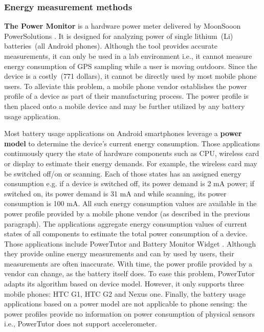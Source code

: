 \subsubsection{Energy measurement methods}
\hspace{10pt} \textbf{The Power Monitor} is a hardware power meter delivered by MoonSooon PowerSolutions \cite{monsoon:powermonitor}.  It is designed for analyzing power of single lithium\ (Li) batteries\ (all Android phones). Although the tool provides accurate measurements, it can only be used in a lab environment i.e., it cannot measure energy consumption of GPS sampling while a user is moving outdoors. Since the device is a costly\ (771 dollars), it cannot be directly used by most mobile phone users. To alleviate this problem, a mobile phone vendor establishes the power profile of a device as part of their manufacturing process. The power profile is then placed onto a mobile device \cite{android:powerprofiles} and may be further utilized by any battery usage application.

Most battery usage applications on Android smartphones leverage a \textbf{power model} to determine the device's current energy consumption. Those applications continuously query the state of hardware components such as CPU, wireless card or display to estimate their energy demands. For example, the wireless card may be switched off/on or scanning. Each of those states has an assigned energy consumption e.g. if a device is switched off, its power demand is 2 mA power; if switched on, its power demand is 31 mA and while scanning, its power consumption is 100 mA. All such energy consumption values are available in the power profile provided by a mobile phone vendor (as described in the previous paragraph). The applications aggregate energy consumption values of current states of all components to estimate the total power consumption of a device. Those applications include PowerTutor \cite{zhang:powertutor} and Battery Monitor Widget \cite{googleplay:batterymonitorwidget}. Although they provide online energy measurements and can by used by users, their measurements are often inaccurate. With time, the power profile provided by a vendor can change, as the battery itself does. To ease this problem, PowerTutor adapts its algorithm based on device model. However, it only supports three mobile phones: HTC G1, HTC G2 and Nexus one. Finally, the battery usage applications based on a power model are not applicable to phone sensing: the power profiles provide no information on power consumption of physical sensors i.e., PowerTutor does not support accelerometer.


